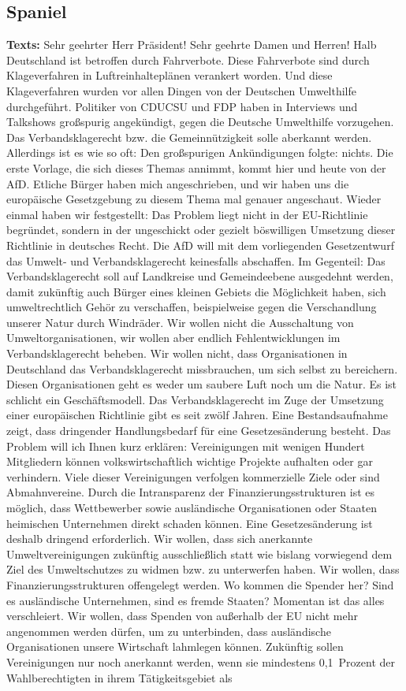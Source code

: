 \documentclass{article}
\begin{document}
\subsection{Spaniel}
\noindent\textbf{Texts:} Sehr geehrter Herr Präsident! Sehr geehrte Damen und Herren! Halb Deutschland ist betroffen durch Fahrverbote. Diese Fahrverbote sind durch Klageverfahren in Luftreinhalteplänen verankert worden. Und diese Klageverfahren wurden vor allen Dingen von der Deutschen Umwelthilfe durchgeführt.  Politiker von CDU\/CSU und FDP haben in Interviews und Talkshows großspurig angekündigt, gegen die Deutsche Umwelthilfe vorzugehen. Das Verbandsklagerecht bzw. die Gemeinnützigkeit solle aberkannt werden. Allerdings ist es wie so oft: Den großspurigen Ankündigungen folgte: nichts.  Die erste Vorlage, die sich dieses Themas annimmt, kommt hier und heute von der AfD.  Etliche Bürger haben mich angeschrieben, und wir haben uns die europäische Gesetzgebung zu diesem Thema mal genauer angeschaut. Wieder einmal haben wir festgestellt: Das Problem liegt nicht in der EU-Richtlinie begründet, sondern in der ungeschickt oder gezielt böswilligen Umsetzung dieser Richtlinie in deutsches Recht.  Die AfD will mit dem vorliegenden Gesetzentwurf das Umwelt- und Verbandsklagerecht keinesfalls abschaffen. Im Gegenteil: Das Verbandsklagerecht soll auf Landkreise und Gemeindeebene ausgedehnt werden, damit zukünftig auch Bürger eines kleinen Gebiets die Möglichkeit haben, sich umweltrechtlich Gehör zu verschaffen, beispielweise gegen die Verschandlung unserer Natur durch Windräder.  Wir wollen nicht die Ausschaltung von Umweltorganisationen, wir wollen aber endlich Fehlentwicklungen im Verbandsklagerecht beheben. Wir wollen nicht, dass Organisationen in Deutschland das Verbandsklagerecht missbrauchen, um sich selbst zu bereichern. Diesen Organisationen geht es weder um saubere Luft noch um die Natur. Es ist schlicht ein Geschäftsmodell. Das Verbandsklagerecht im Zuge der Umsetzung einer europäischen Richtlinie gibt es seit zwölf Jahren. Eine Bestandsaufnahme zeigt, dass dringender Handlungsbedarf für eine Gesetzesänderung besteht. Das Problem will ich Ihnen kurz erklären: Vereinigungen mit wenigen Hundert Mitgliedern können volkswirtschaftlich wichtige Projekte aufhalten oder gar verhindern. Viele dieser Vereinigungen verfolgen kommerzielle Ziele oder sind Abmahnvereine. Durch die Intransparenz der Finanzierungsstrukturen ist es möglich, dass Wettbewerber sowie ausländische Organisationen oder Staaten heimischen Unternehmen direkt schaden können. Eine Gesetzesänderung ist deshalb dringend erforderlich.  Wir wollen, dass sich anerkannte Umweltvereinigungen zukünftig ausschließlich statt wie bislang vorwiegend dem Ziel des Umweltschutzes zu widmen bzw. zu unterwerfen haben. Wir wollen, dass Finanzierungsstrukturen offengelegt werden. Wo kommen die Spender her? Sind es ausländische Unternehmen, sind es fremde Staaten? Momentan ist das alles verschleiert. Wir wollen, dass Spenden von außerhalb der EU nicht mehr angenommen werden dürfen, um zu unterbinden, dass ausländische Organisationen unsere Wirtschaft lahmlegen können.  Zukünftig sollen Vereinigungen nur noch anerkannt werden, wenn sie mindestens 0,1 Prozent der Wahlberechtigten in ihrem Tätigkeitsgebiet als 
\end{document}
